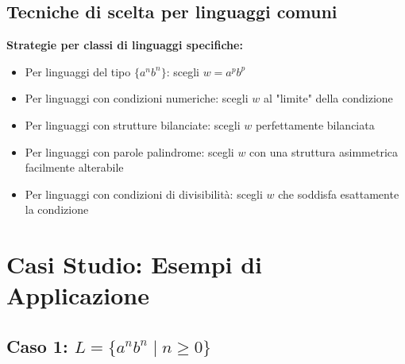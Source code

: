 \documentclass[12pt,a4paper]{article}
\begin{document}
\subsection{Tecniche di scelta per linguaggi comuni}

\begin{suggerimento}
\textbf{Strategie per classi di linguaggi specifiche:}
\begin{itemize}
    \item Per linguaggi del tipo $\{a^n b^n\}$: scegli $w = a^p b^p$
    \item Per linguaggi con condizioni numeriche: scegli $w$ al "limite" della condizione
    \item Per linguaggi con strutture bilanciate: scegli $w$ perfettamente bilanciata
    \item Per linguaggi con parole palindrome: scegli $w$ con una struttura asimmetrica facilmente alterabile
    \item Per linguaggi con condizioni di divisibilità: scegli $w$ che soddisfa esattamente la condizione
\end{itemize}
\end{suggerimento}

\section{Casi Studio: Esempi di Applicazione}

\subsection{Caso 1: $L = \{a^n b^n \mid n \geq 0\}$}
\end{document}
